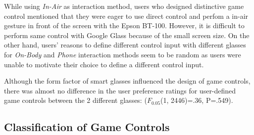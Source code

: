 \documentclass{sigchi}
\begin{document}
  While using \emph{In-Air} as interaction method, users who designed distinctive game control mentioned that they were eager to use direct control and perfom a in-air gesture in front of the screen with the Epson BT-100. However, it is difficult to perform same control with Google Glass because of the small screen size. On the other hand, users' reasons to define different control input with different glasses for \emph{On-Body} and \emph{Phone} interaction methods seem to be random as users were unable to motivate their choice to define a different control input.

  Although the form factor of smart glasses influenced the design of game controls, there was almost no difference in the user preference ratings for user-defined game controls between the 2 different glasses: ($F_{0.05}$(1, 2446)=.36, P=.549).


  \subsection{Classification of Game Controls}
\end{document}
